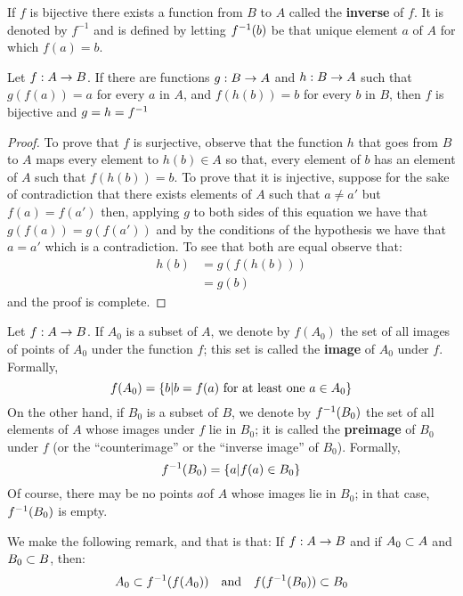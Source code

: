 If $f$ is bijective there exists a function from $B$ to $A$ called the \textbf{inverse} of $f$. It is denoted by $ f^{-1} $ and is defined by letting $ f^{-1}(b) $ be that unique element $a$ of $A$   for which $f(a) = b$. 

\begin{lem}
	Let $f : A \rightarrow B $. If there are functions $ g : B \rightarrow A $ and $ h : B \rightarrow A $ such that $ g(f(a)) = a $ for every $a$ in $A$, and $f(h(b)) = b$ for every $b$ in $B$, then $f$ is bijective and $ g = h= f^{-1} $
\end{lem}
\begin{proof}
	To prove that $f$ is surjective, observe that the function $h$ that goes from $B$ to $A$ maps every element to $h(b) \in A$ so that, every element of $b$ has an element of $A$ such that $ f(h(b)) = b$. To prove that it is injective, suppose for the sake of contradiction that there exists elements of $A$ such that $ a \neq a' $ but $f(a) = f(a') $ then, applying $g$ to both sides of this equation we have that $ g(f(a)) = g(f(a')) $ and by the conditions of the hypothesis we have that $a = a'$ which is a contradiction. To see that both are equal observe that:
	\begin{align*}
	h(b) &= g(f(h(b))) \\
		 &= g(b)		
	\end{align*}
	and the proof is complete.
\end{proof}
\begin{define}
	Let $ f : A \rightarrow B $. If $A_0$ is a subset of $A$, we denote by $f(A_0)$ the set of all images of points of $A_0$ under the function $f$; this set is called the \textbf{image} of $A_0$ under $f$. Formally,
	\[ f(A_0) = \left\lbrace b | b = f(a) \textrm{ for at least one } a \in A_0 \right\rbrace \]
	On the other hand, if $ B_0 $  is a subset of $B$, we denote by $f^{-1}(B_0) $ the set of all elements of $A$ whose images under $f$ lie in $B_0$; it is called the \textbf{preimage} of $B_0$ under $f$ (or the ``counterimage'' or the ``inverse image'' of $B_0$). Formally,
	\[ f^{-1}(B_0) = \left\lbrace a | f(a) \in B_0 \right\rbrace \]
	Of course, there may be no points $a$of $A$ whose images lie in $ B_0 $; in that case, $f^{-1} (B_0) $ is empty.
	
\end{define}

We make the following remark, and that is that: If $ f : A \rightarrow B $  and if $A_0 \subset A$ and $B_0 \subset B$, then:
\[ A_0 \subset f^{-1}(f(A_0)) \quad \textrm{and} \quad f(f^{-1}(B_0)) \subset B_0 \]

